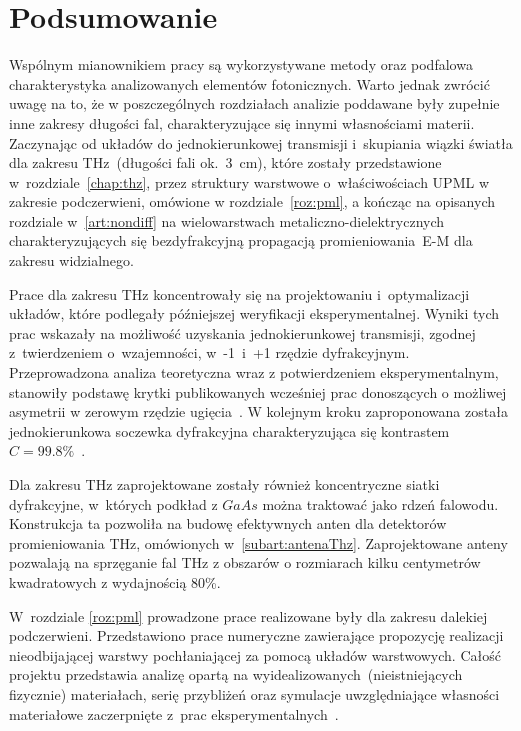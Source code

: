 \chapter{Podsumowanie}
Wspólnym mianownikiem pracy są wykorzystywane metody oraz podfalowa charakterystyka analizowanych elementów fotonicznych. Warto jednak zwrócić uwagę na to, że w poszczególnych rozdziałach analizie poddawane były zupełnie inne zakresy długości fal, charakteryzujące się innymi własnościami materii. Zaczynając od układów do jednokierunkowej transmisji i~skupiania wiązki światła dla zakresu THz~(długości fali ok.~3~cm), które zostały przedstawione w~rozdziale~\ref{chap:thz}, przez struktury warstwowe o~właściwościach UPML w zakresie podczerwieni, omówione w rozdziale~\ref{roz:pml}, a kończąc na opisanych rozdziale w~\ref{art:nondiff} na wielowarstwach metaliczno-dielektrycznych charakteryzujących się bezdyfrakcyjną propagacją promieniowania~E-M dla zakresu widzialnego.

Prace dla zakresu THz koncentrowały się na projektowaniu i~optymalizacji układów, które podlegały późniejszej weryfikacji eksperymentalnej. Wyniki tych prac wskazały na możliwość uzyskania jednokierunkowej transmisji, zgodnej z~twierdzeniem o~wzajemności, w~-1~i~+1 rzędzie dyfrakcyjnym. Przeprowadzona analiza teoretyczna wraz z potwierdzeniem eksperymentalnym, stanowiły podstawę krytki publikowanych wcześniej prac donoszących o możliwej asymetrii w zerowym rzędzie ugięcia~\cite{Stolarek:13}. W kolejnym kroku zaproponowana została jednokierunkowa soczewka dyfrakcyjna charakteryzująca się kontrastem $C=99.8\%$~\cite{Yavorskiy:14}. 

Dla zakresu THz zaprojektowane zostały również koncentryczne siatki dyfrakcyjne, w~których podkład z $GaAs$ można traktować jako rdzeń falowodu. Konstrukcja ta pozwoliła na budowę efektywnych anten dla detektorów promieniowania THz, omówionych w~\ref{subart:antenaThz}. Zaprojektowane anteny pozwalają na sprzęganie fal THz z obszarów o rozmiarach kilku centymetrów kwadratowych z wydajnością  80\%.

W~rozdziale \ref{roz:pml} prowadzone prace realizowane były dla zakresu dalekiej podczerwieni. Przedstawiono prace numeryczne zawierające propozycję realizacji nieodbijającej warstwy pochłaniającej za pomocą układów warstwowych. Całość projektu przedstawia analizę opartą na wyidealizowanych~(nieistniejących fizycznie) materiałach, serię przybliżeń oraz symulacje uwzględniające własności materiałowe zaczerpnięte z~prac eksperymentalnych~\cite{ania2015,stefaniuk2015perfectly}.

